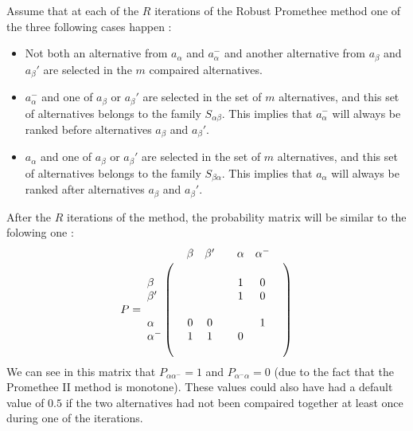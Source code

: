 Assume that at each of the $R$ iterations of the Robust Promethee method one of the three following cases happen :
\begin{itemize}
    \item Not both an alternative from $a_\alpha$ and $a_\alpha ^-$ and another alternative from $a_\beta$ and $a_\beta'$ are selected in the $m$ compaired alternatives. 
    \item $a_\alpha^-$ and one of $a_\beta$ or $a_\beta'$ are selected in the set of $m$ alternatives, and this set of alternatives belongs to the family $S_{\alpha \beta}$. This implies that $a_\alpha^-$ will always be ranked before alternatives $a_\beta$ and $a_\beta'$.      
    \item $a_\alpha$ and one of $a_\beta$ or $a_\beta'$ are selected in the set of $m$ alternatives, and this set of alternatives belongs to the family $S_{\beta \alpha}$. This implies that $a_\alpha$ will always be ranked after alternatives $a_\beta$ and $a_\beta'$.      
\end{itemize}

After the $R$ iterations of the method, the probability matrix will be similar to the folowing one : \\
        $$P= \bordermatrix{ &  & \beta   & \beta'   & & \alpha  & \alpha^- &\cr 
                           &  &         &          & &         &          &\cr
               \beta       &  &         &          & &   1     &    0     &\cr 
               \beta'      &  &         &          & &   1     &    0     & \cr
                           &  &         &          & &         &          &\cr
               \alpha      &  &    0    & 0        & &         &    1     &\cr 
               \alpha^-    &  &    1    & 1        & &   0     &         &\cr 
                           &  &         &          & &         &          &\cr
        } $$
        We can see in this matrix that $P_{\alpha \alpha^-} =1$ and $P_{\alpha ^- \alpha}=0$ (due to the fact that the Promethee II method is monotone). These values could also have had a default value of $0.5$ if the two alternatives had not been compaired together at least once during one of the iterations.


